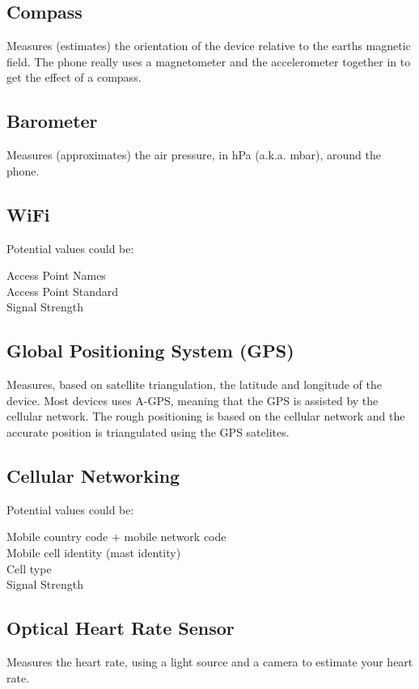\subsection{Compass}
\label{sub:compass}
Measures (estimates) the orientation of the device relative to the earths magnetic field. The phone really uses a magnetometer and the accelerometer together in to get the effect of a compass. 

\subsection{Barometer}
\label{sub:barometer}
Measures (approximates) the air pressure, in hPa (a.k.a. mbar), around the phone.

\subsection{WiFi}
\label{sub:wifi}
Potential values could be: 

Access Point Names \\
Access Point Standard \\
Signal Strength

\subsection{Global Positioning System (GPS)}
\label{sub:gps}
Measures, based on satellite triangulation,  the latitude and longitude of the device. Most devices uses A-GPS, meaning that the GPS is assisted by the cellular network. The rough positioning is based on the cellular network and the accurate position is triangulated using the GPS satelites.

\subsection{Cellular Networking}
\label{sub:cellular_networking}
Potential values could be: 

Mobile country code + mobile network code \\
Mobile cell identity (mast identity) \\
Cell type  \\
Signal Strength \\


\subsection{Optical Heart Rate Sensor}
\label{sub:optical_heart_rate_sensor}
Measures the heart rate, using a light source and a camera to estimate your heart rate.

